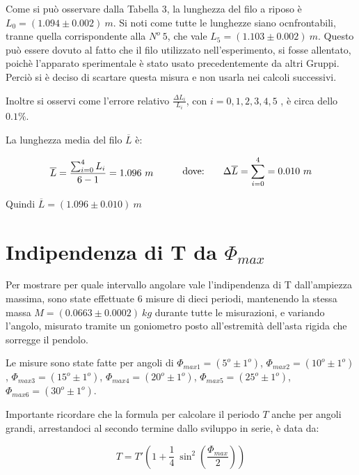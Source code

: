 \documentclass[12pt, a4paper]{article}
\begin{document}
Come si può osservare dalla Tabella 3, la lunghezza del filo a riposo è $L_0=(1.094\pm0.002)\ m$. Si noti come tutte le lunghezze siano ocnfrontabili, tranne quella corrispondente alla $N^o\ 5$, che vale $L_5=(1.103\pm0.002)\ m$. Questo può essere dovuto al fatto che il filo utilizzato nell'esperimento, si fosse allentato, poichè l'apparato sperimentale è stato usato precedentemente da altri Gruppi. 
Perciò si è deciso di scartare questa misura e non usarla nei calcoli successivi. 

Inoltre si osservi come l'errore relativo $\displaystyle \frac{\Delta L_i}{L_i}$, con $i={0,1,2,3,4,5}$ , è circa dello $0.1\%$.

La lunghezza media del filo $\overline{L}$ è:

\begin{equation*}
\begin{aligned}
  & & \overline{L}=\frac{\sum_{i=0}^{4}L_i}{6-1}=1.096\ m
  &\quad{} 
  \end{aligned}
  \begin{aligned}
  & &\text{dove:\phantom{.......}} \Delta \overline{L}=\sum_{i=0}^{4}=0.010\ m
  &
  \end{aligned}
\end{equation*}
\bigskip

Quindi $\overline{L}=(1.096\pm0.010)\ m$


\section{Indipendenza di T da $\Phi_{max}$}
\label{Indip T da angolo}

Per mostrare per quale intervallo angolare vale l'indipendenza di T dall'ampiezza massima, sono state effettuate 6 misure di dieci periodi, mantenendo la stessa massa $M=(0.0663\pm0.0002)\ kg$ durante tutte le misurazioni, e variando l'angolo, misurato tramite un goniometro posto all'estremità dell'asta rigida che sorregge il pendolo. 
\bigskip

Le misure sono state fatte per angoli di $\Phi_{max1}=(5^o\pm1^o)$, $\Phi_{max2}=(10^o\pm1^o)$, $\Phi_{max3}=(15^o\pm1^o)$, $\Phi_{max4}=(20^o\pm1^o)$, $\Phi_{max5}=(25^o\pm1^o)$, $\Phi_{max6}=(30^o\pm1^o)$.

Importante ricordare che la formula per calcolare il periodo $T$ anche per angoli grandi, arrestandoci al secondo termine dallo sviluppo in serie, è data da:

\begin{equation*}
    T=T' \left(1+\frac{1}{4}\ \sin^2{\left(\frac{\Phi_{max}}{2}\right)}\right)
\end{equation*}
\end{document}
